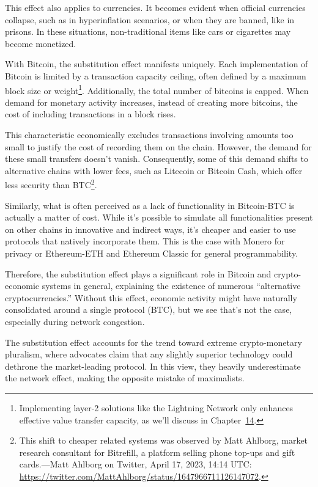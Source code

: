 \documentclass[
  a5paper,
  smalldemyvopaper,10pt,twoside,onecolumn,openright,extrafontsizes,hidelinks]{memoir}
\begin{document}
This effect also applies to currencies. It becomes evident when official
currencies collapse, such as in hyperinflation scenarios, or when they
are banned, like in prisons. In these situations, non-traditional items
like cars or cigarettes may become monetized.

With Bitcoin, the substitution effect manifests uniquely. Each
implementation of Bitcoin is limited by a transaction capacity ceiling,
often defined by a maximum block size or weight\footnote{Implementing
  layer-2 solutions like the Lightning Network only enhances effective
  value transfer capacity, as we'll discuss in
  Chapter~\hyperref[ch:scalabilite]{14}.}. Additionally, the total
number of bitcoins is capped. When demand for monetary activity
increases, instead of creating more bitcoins, the cost of including
transactions in a block rises.

This characteristic economically excludes transactions involving amounts
too small to justify the cost of recording them on the chain. However,
the demand for these small transfers doesn't vanish. Consequently, some
of this demand shifts to alternative chains with lower fees, such as
Litecoin or Bitcoin Cash, which offer less security than BTC\footnote{This
  shift to cheaper related systems was observed by Matt Ahlborg, market
  research consultant for Bitrefill, a platform selling phone top-ups
  and gift cards.---Matt Ahlborg on Twitter, April 17, 2023, 14:14 UTC:
  \url{https://twitter.com/MattAhlborg/status/1647966711126147072}.}.

Similarly, what is often perceived as a lack of functionality in
Bitcoin-BTC is actually a matter of cost. While it's possible to
simulate all functionalities present on other chains in innovative and
indirect ways, it's cheaper and easier to use protocols that natively
incorporate them. This is the case with Monero for privacy or
Ethereum-ETH and Ethereum Classic for general programmability.

Therefore, the substitution effect plays a significant role in Bitcoin
and crypto-economic systems in general, explaining the existence of
numerous ``alternative cryptocurrencies.'' Without this effect, economic
activity might have naturally consolidated around a single protocol
(BTC), but we see that's not the case, especially during network
congestion.

The substitution effect accounts for the trend toward extreme
crypto-monetary pluralism, where advocates claim that any slightly
superior technology could dethrone the market-leading protocol. In this
view, they heavily underestimate the network effect, making the opposite
mistake of maximalists.
\end{document}
